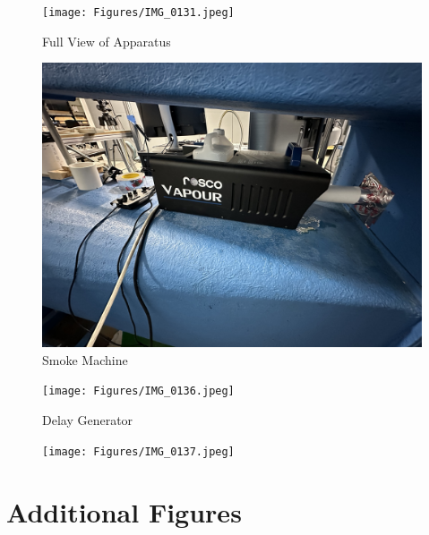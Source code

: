 \begin{figure}[htpb]
    \centering
    \texttt{[image: Figures/IMG\_0131.jpeg]}
    \caption{Full View of Apparatus}
    \label{fig:Full_Apparatus}
\end{figure}

\begin{figure}[htpb]
    \centering
    \includegraphics[width=0.75\linewidth]{Figures/IMG_0135.jpeg}
    \caption{Smoke Machine}
    \label{fig:Smoke_Machine}
\end{figure}

\begin{figure}[htpb]
    \centering
    \texttt{[image: Figures/IMG\_0136.jpeg]}
    \caption{Delay Generator}
    \label{fig:Delay_generator}
\end{figure}

\begin{figure}[htpb]
    \centering
    \texttt{[image: Figures/IMG\_0137.jpeg]}
    \caption{}
    \label{fig:}
\end{figure}

\newpage
\section{Additional Figures} \label{sec:additional_figures}

\begin{figure}[htpb]
    \centering
    
    \caption{}
    \label{fig:}
\end{figure}

\begin{figure}[htpb]
    \centering
    
    \caption{}
    \label{fig:}
\end{figure}

